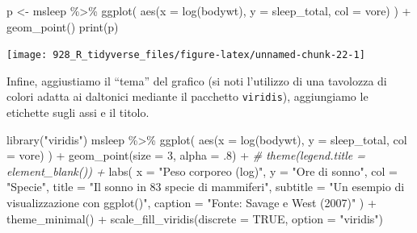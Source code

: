 \documentclass[
  10pt,
  italian,
  a4paper,
  extrafontsizes,onecolumn,openright
  ]{memoir}
\newenvironment{Shaded}{\begin{snugshade}}{\end{snugshade}}
\newcommand{\AttributeTok}[1]{\textcolor[rgb]{0.77,0.63,0.00}{#1}}
\newcommand{\CommentTok}[1]{\textcolor[rgb]{0.56,0.35,0.01}{\textit{#1}}}
\newcommand{\ConstantTok}[1]{\textcolor[rgb]{0.00,0.00,0.00}{#1}}
\newcommand{\DecValTok}[1]{\textcolor[rgb]{0.00,0.00,0.81}{#1}}
\newcommand{\FunctionTok}[1]{\textcolor[rgb]{0.00,0.00,0.00}{#1}}
\newcommand{\NormalTok}[1]{#1}
\newcommand{\OtherTok}[1]{\textcolor[rgb]{0.56,0.35,0.01}{#1}}
\newcommand{\SpecialCharTok}[1]{\textcolor[rgb]{0.00,0.00,0.00}{#1}}
\newcommand{\StringTok}[1]{\textcolor[rgb]{0.31,0.60,0.02}{#1}}
\begin{document}
\begin{Shaded}
\begin{Highlighting}[]
\NormalTok{p }\OtherTok{\textless{}{-}}\NormalTok{ msleep }\SpecialCharTok{\%\textgreater{}\%} 
  \FunctionTok{ggplot}\NormalTok{(}
    \FunctionTok{aes}\NormalTok{(}\AttributeTok{x =} \FunctionTok{log}\NormalTok{(bodywt), }\AttributeTok{y =}\NormalTok{ sleep\_total, }\AttributeTok{col =}\NormalTok{ vore)}
\NormalTok{  ) }\SpecialCharTok{+}
  \FunctionTok{geom\_point}\NormalTok{()}
\FunctionTok{print}\NormalTok{(p)}
\end{Highlighting}
\end{Shaded}

\begin{center}\texttt{[image: 928\_R\_tidyverse\_files/figure-latex/unnamed-chunk-22-1]} \end{center}

Infine, aggiustiamo il ``tema'' del grafico (si noti l'utilizzo di una tavolozza di colori adatta ai daltonici mediante il pacchetto \texttt{viridis}), aggiungiamo le etichette sugli assi e il titolo.

\begin{Shaded}
\begin{Highlighting}[]
\FunctionTok{library}\NormalTok{(}\StringTok{"viridis"}\NormalTok{)}
\NormalTok{msleep }\SpecialCharTok{\%\textgreater{}\%}
  \FunctionTok{ggplot}\NormalTok{(}
    \FunctionTok{aes}\NormalTok{(}\AttributeTok{x =} \FunctionTok{log}\NormalTok{(bodywt), }\AttributeTok{y =}\NormalTok{ sleep\_total, }\AttributeTok{col =}\NormalTok{ vore)}
\NormalTok{  ) }\SpecialCharTok{+}
  \FunctionTok{geom\_point}\NormalTok{(}\AttributeTok{size =} \DecValTok{3}\NormalTok{, }\AttributeTok{alpha =}\NormalTok{ .}\DecValTok{8}\NormalTok{) }\SpecialCharTok{+}
  \CommentTok{\# theme(legend.title = element\_blank()) +}
  \FunctionTok{labs}\NormalTok{(}
    \AttributeTok{x =} \StringTok{"Peso corporeo (log)"}\NormalTok{,}
    \AttributeTok{y =} \StringTok{"Ore di sonno"}\NormalTok{,}
    \AttributeTok{col =} \StringTok{"Specie"}\NormalTok{, }
    \AttributeTok{title =} \StringTok{"Il sonno in 83 specie di mammiferi"}\NormalTok{,}
    \AttributeTok{subtitle =} \StringTok{"Un esempio di visualizzazione con ggplot()"}\NormalTok{,}
    \AttributeTok{caption =} \StringTok{"Fonte: Savage e West (2007)"}
\NormalTok{  ) }\SpecialCharTok{+}
  \FunctionTok{theme\_minimal}\NormalTok{() }\SpecialCharTok{+}
  \FunctionTok{scale\_fill\_viridis}\NormalTok{(}\AttributeTok{discrete =} \ConstantTok{TRUE}\NormalTok{, }\AttributeTok{option =} \StringTok{"viridis"}\NormalTok{)}
\end{Highlighting}
\end{Shaded}
\end{document}
